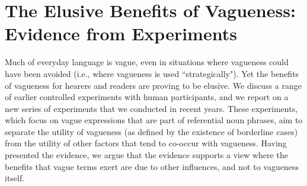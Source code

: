\documentclass[graybox,envcountchap,sectrefs%
,footinfo
]{svmono}
\begin{document}

\chapter{The Elusive Benefits of Vagueness: Evidence from Experiments}
\label{intro} %

Much of everyday language is vague, even in situations where vagueness could have been
avoided (i.e., where vagueness is used “strategically"). Yet the benefits of vagueness for
hearers and readers are proving to be elusive. We discuss a range of earlier controlled
experiments with human participants, and we report on a new series of experiments that
we conducted in recent years. These experiments, which focus on vague expressions that
are part of referential noun phrases, aim to separate the utility of vagueness (as defined by
the existence of borderline cases) from the utility of other factors that tend to co-occur
with vagueness. Having presented the evidence, we argue that the evidence supports a view
where the benefits that vague terms exert are due to other influences, and not to vagueness
itself.



\backmatter%



\backmatter

\printindex
\end{document}
